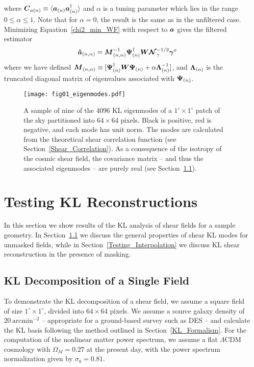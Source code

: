 where $\boldsymbol{C}_{a(n)}\equiv\langle 
\boldsymbol{a}_{(n)}\boldsymbol{a}_{(n)}^\dagger\rangle$ 
and $\alpha$ is a tuning parameter which lies in the range $0\le\alpha\le 1$. 
Note that for $\alpha=0$, the result is the same as in the unfiltered case.
Minimizing Equation~\ref{chi2_min_WF} with respect to $\boldsymbol{a}$ gives the
filtered estimator
\begin{equation}
  \label{a_WF}
  \boldsymbol{\hat{a}}_{(n,\alpha)} = 
  \boldsymbol{M}_{(n,\alpha)}^{-1} 
  \boldsymbol{\Psi}_{(n)}^\dagger \boldsymbol{W} \boldsymbol{\mathcal{N}}_\gamma^{-1/2}\boldsymbol{\gamma}^o
\end{equation}
where we have defined $\boldsymbol{M}_{(n,\alpha)} 
\equiv [\boldsymbol{\Psi}_{(n)}^\dagger\boldsymbol{W}\boldsymbol{\Psi}_{(n)} 
  + \alpha\boldsymbol{\Lambda}_{(n)}^{-1}]$, and
$\boldsymbol{\Lambda}_{(n)}$ is the truncated diagonal matrix of 
eigenvalues associated with $\boldsymbol{\Psi}_{(n)}$.

\begin{figure*}
 \centering
 \texttt{[image: fig01\_eigenmodes.pdf]} 
 \caption{
   A sample of nine of the 4096 KL eigenmodes 
   of a $1^\circ\times 1^\circ$ patch of the sky partitioned into
   $64\times 64$ pixels.  Black is positive, red is negative, and each mode
   has unit norm. The modes are calculated from the theoretical
   shear correlation function (see Section~\ref{Shear_Correlation}).  
   As a consequence of the isotropy of the cosmic shear field,
   the covariance matrix -- and thus the associated eigenmodes --
   are purely real (see Section~\ref{Testing_Shear_KL}).
   \label{fig_KL_modes} }
\end{figure*} 

\section{Testing KL Reconstructions}
\label{Testing_Reconstruction}
In this section we show results of the KL analysis of shear fields for
a sample geometry.  In Section~\ref{Testing_Shear_KL} we discuss the general
properties of shear KL modes for unmasked fields, while in
Section~\ref{Testing_Interpolation} we discuss KL shear reconstruction 
in the presence of masking. 

\subsection{KL Decomposition of a Single Field}
\label{Testing_Shear_KL}
To demonstrate the KL decomposition of a shear field, we assume a square field
of size $1^\circ\times 1^\circ$, divided into $64\times 64$ pixels.  We assume
a source galaxy density of $20\ \mathrm{arcmin}^{-2}$ -- appropriate for a
ground-based survey such as DES -- and calculate the
KL basis following the method outlined in Section~\ref{KL_Formalism}.
For the computation of the nonlinear matter power spectrum, we assume a flat 
$\Lambda$CDM cosmology with $\Omega_M=0.27$ at the present day, with
the power spectrum normalization given by $\sigma_8=0.81$.


